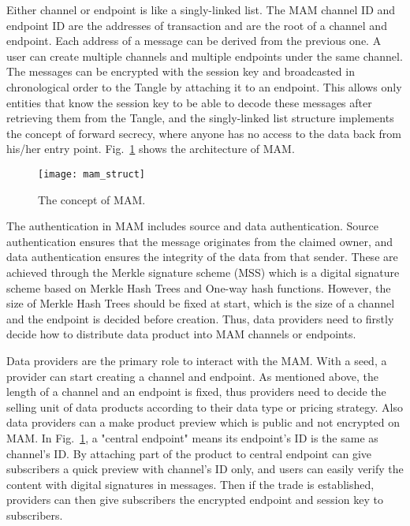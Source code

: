 Either channel or endpoint is like a singly-linked list. The MAM channel ID and endpoint ID are the addresses of transaction and are the root of a channel and endpoint. Each address of a message can be derived from the previous one. A user can create multiple channels and multiple endpoints under the same channel. The messages can be encrypted with the session key and broadcasted in chronological order to the Tangle by attaching it to an endpoint. This allows only entities that know the session key to be able to decode these messages after retrieving them from the Tangle, and the singly-linked list structure implements the concept of forward secrecy, where anyone has no access to the data back from his/her entry point. Fig.~\ref{fig:mam_struct} shows the architecture of MAM.

\begin{figure}[!t]
    \centering
    \texttt{[image: mam\_struct]}
    \caption{The concept of MAM.}
    \label{fig:mam_struct}
\end{figure}

The authentication in MAM includes source and data authentication. Source authentication ensures that the message originates from the claimed owner, and data authentication ensures the integrity of the data from that sender. These are achieved through the Merkle signature scheme\cite{MSS} (MSS) which is a digital signature scheme based on Merkle Hash Trees and One-way hash functions. However, the size of Merkle Hash Trees should be fixed at start, which is the size of a channel and the endpoint is decided before creation. Thus, data providers need to firstly decide how to distribute data product into MAM channels or endpoints.

Data providers are the primary role to interact with the MAM. With a seed, a provider can start creating a channel and endpoint. As mentioned above, the length of a channel and an endpoint is fixed, thus providers need to decide the selling unit of data products according to their data type or pricing strategy. Also data providers can a make product preview which is public and not encrypted on MAM. In Fig.~\ref{fig:mam_struct}, a "central endpoint" means its endpoint's ID is the same as channel's ID. By attaching part of the product to central endpoint can give subscribers a quick preview with channel's ID only, and users can easily verify the content with digital signatures in messages. Then if the trade is established, providers can then give subscribers the encrypted endpoint and session key to subscribers.
 
